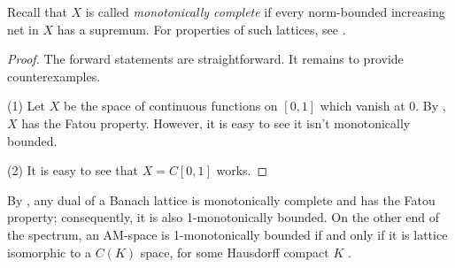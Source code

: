 \documentclass{amsart}
\theoremstyle{plain}
\newtheorem{proposition}[theorem]{Proposition}
\theoremstyle{definition}
\numberwithin{equation}{section}
\newcommand{\marg}[1]{\marginpar{\tiny #1}}     %
\newcommand{\ana}[1]{{\textcolor{blue}{{\bf A.I:} #1}}}
\begin{document}
Recall that $X$ is called \emph{monotonically complete} if every norm-bounded increasing net in $X$ has a supremum. For properties of such lattices, see \cite[Section 2.4]{M-N}.

\begin{proof}
 The forward statements are straightforward. It remains to provide counterexamples.
 
 (1) Let $X$ be the space of continuous functions on $[0,1]$ which vanish at $0$. By \cite{Wick07}, $X$ has the Fatou property. However, it is easy to see it isn't monotonically bounded.
 
 (2) It is easy to see that $X = C[0,1]$ works. 
\end{proof}

By \cite[Theorem 2.4.19]{M-N}, any dual of a Banach lattice is monotonically complete and has the Fatou property; consequently, it is also 1-monotonically bounded.
On the other end of the spectrum, an AM-space is 1-monotonically bounded if and only if it is lattice isomorphic to a $C(K)$ space, for some Hausdorff compact $K$ \cite{ABT}.

\end{document}
